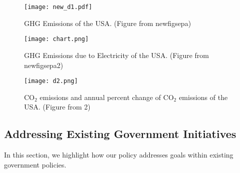 \documentclass[10pt]{book} %
\begin{document}
\begin{figure}
\begin{center}
\texttt{[image: new\_d1.pdf]}
\caption{GHG Emissions of the USA. (Figure from \cite{deb}{newfigsepa})}
\label{d1}
\end{center}
\end{figure}

\begin{figure}
\begin{center}
\texttt{[image: chart.png]}
\caption{GHG Emissions due to Electricity of the USA. (Figure from \cite{deb}{newfigsepa2})}
\label{d1}
\end{center}
\end{figure}

\begin{figure}
\begin{center}
\texttt{[image: d2.png]}
\caption{CO$_{2}$ emissions and annual percent change of CO$_{2}$ emissions of the USA. (Figure from \cite{deb}{2})}
\label{d2}
\end{center}
\end{figure}

\subsection{Addressing Existing Government Initiatives}
In this section, we highlight how our policy addresses goals within existing government policies.
\end{document}
